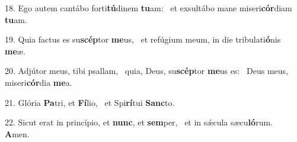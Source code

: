 18. Ego autem cantábo forti\textbf{tú}dinem \textbf{tu}am: \ast\  et exsultábo mane miseri\textbf{cór}diam \textbf{tu}am.\

19. Quia factus es su\textbf{scép}tor \textbf{me}us, \ast\  et refúgium meum, in die tribulati\textbf{ó}nis \textbf{me}æ.\

20. Adjútor meus, tibi psallam, \dag\  quia, Deus, su\textbf{scép}tor \textbf{me}us es: \ast\  Deus meus, miseri\textbf{cór}dia \textbf{me}a.\

21. Glória \textbf{Pa}tri, et \textbf{Fí}lio, \ast\  et Spi\textbf{rí}tui \textbf{Sanc}to.\

22. Sicut erat in princípio, et \textbf{nunc}, et \textbf{sem}per, \ast\  et in sǽcula sæcu\textbf{ló}rum. \textbf{A}men.\

